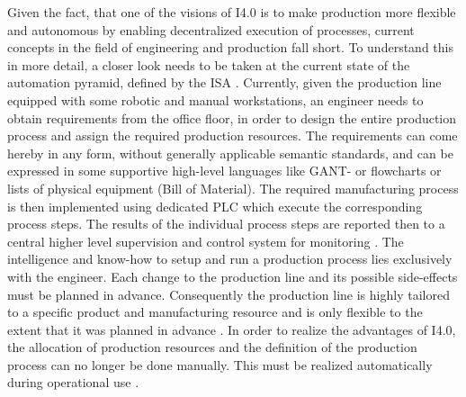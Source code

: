 Given the fact, that one of the visions of \ac{I4.0} is to make production more flexible and autonomous by enabling decentralized execution of processes, current concepts in the field of engineering and production fall short. To understand this in more detail, a closer look needs to be taken at the current state of the automation pyramid, defined by the \ac{ISA} \cite{InternationalSocietyofAutomation2008EnterpriseIntegration}. Currently, given the production line equipped with some robotic and manual workstations, an engineer needs to obtain requirements from the office floor, in order to design the entire production process and assign the required production resources. The requirements can come hereby in any form, without generally applicable semantic standards, and can be expressed in some supportive high-level languages like GANT- or flowcharts or lists of physical equipment (Bill of Material). The required manufacturing process is then implemented using dedicated \ac{PLC} which execute the corresponding process steps. The results of the individual process steps are reported then to a central higher level supervision and control system for monitoring \cite[p.2, 3]{Wagner2017ThePlant}. The intelligence and know-how to setup and run a production process lies exclusively with the engineer. Each change to the production line and its possible side-effects must be planned in advance. Consequently the production line is highly tailored to a specific product and manufacturing resource and is only flexible to the extent that it was planned in advance \cite[p. 1]{Keddis2015Capability-basedSystems}. In order to realize the advantages of \ac{I4.0}, the allocation of production resources and the definition of the production process can no longer be done manually. This must be realized automatically during operational use \cite[p. 9]{Bock2016Weiterentwicklung4.0-Komponenten}.

